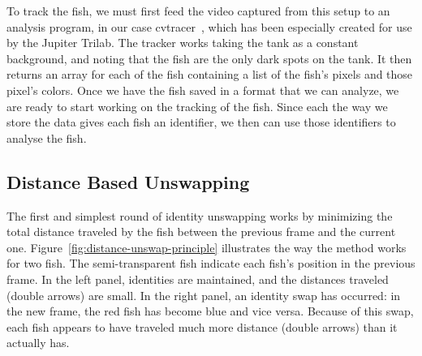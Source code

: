 \documentclass{article}
\begin{document}
To track the fish, we must first feed the video captured from this setup to an analysis program, in our case cvtracer~\cite{patch_kinematic_2020, patch_patchmemorycvtracer_2020}, which has been especially created for use by the Jupiter Trilab. 
The tracker works taking the tank as a constant background, and noting that the fish are the only dark spots on the tank. It then returns an array for each of the fish containing a list of the fish's pixels and those pixel's colors. Once we have the fish saved in a format that we can analyze, we are ready to start working on the tracking of the fish. Since each the way we store the data gives each fish an identifier, we then can use those identifiers to analyse the fish.

%


\subsection{Distance Based Unswapping}

The first and simplest round of identity unswapping works by minimizing the total distance traveled by the fish between the previous frame and the current one. Figure~\ref{fig:distance-unswap-principle} illustrates the way the method works for two fish. The semi-transparent fish indicate each fish's position in the previous frame. In the left panel, identities are maintained, and the distances traveled (double arrows) are small. In the right panel, an identity swap has occurred: in the new frame, the red fish has become blue and vice versa. Because of this swap, each fish appears to have traveled much more distance (double arrows) than it actually has.
\end{document}
